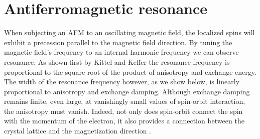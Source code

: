 %
%
\section{Antiferromagnetic resonance}
When subjecting an AFM to an oscillating magnetic field, the localized spins will exhibit a precession parallel to the magnetic field direction. By tuning the magnetic field's frequency to an internal harmonic frequency we can observe resonance. As shown first by Kittel and Keffer \cite{PhysRev.82.565, PhysRev.85.329} the resonance frequency is proportional to the square root of the product of anisotropy and exchange energy. The width of the resonance frequency however, as we show below, is linearly proportional to anisotropy and exchange damping. Although exchange damping remains finite, even large, at vanishingly small values of spin-orbit interaction, the anisotropy must vanish. Indeed, not only does spin-orbit connect the spin with the momentum of the electron, it also provides a connection between the crystal lattice and the magnetization direction  \cite{hellman_interface-induced_2017, dieny_perpendicular_2017}.

